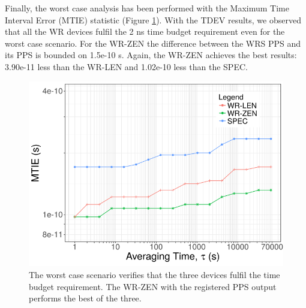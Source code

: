
Finally, the worst case analysis has been performed with the Maximum Time Interval Error (MTIE) 
statistic (Figure \ref{fig:mtie_exp1}). With the TDEV results, we observed that 
all the WR devices fulfil the 2 ns time budget requirement even for the worst case scenario. 
For the WR-ZEN the difference between the WRS PPS and its PPS is bounded on 1.5e-10 s. Again, the 
WR-ZEN achieves the best results: 3.90e-11 less than the WR-LEN and 1.02e-10 less than the SPEC.

\begin{figure}
	\centering
	\includegraphics[width=0.7\linewidth]{img/mtie_exp1}
	\caption[MTIE for the WR devices comparison.]{The worst case scenario 
	verifies that the three devices fulfil the time budget requirement. The 
	WR-ZEN with the registered PPS output performs the best of the three.}
	\label{fig:mtie_exp1}
\end{figure}


